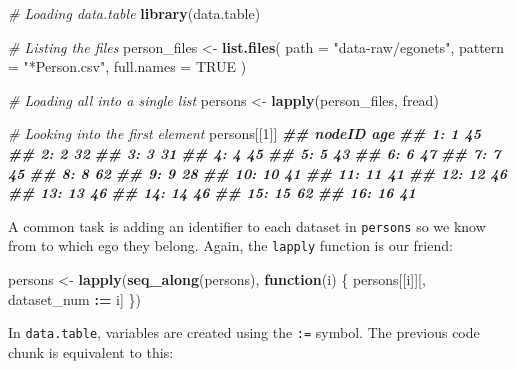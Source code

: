 \documentclass[
]{book}
\newenvironment{Shaded}{\begin{snugshade}}{\end{snugshade}}
\newcommand{\AttributeTok}[1]{\textcolor[rgb]{0.13,0.29,0.53}{#1}}
\newcommand{\CommentTok}[1]{\textcolor[rgb]{0.56,0.35,0.01}{\textit{#1}}}
\newcommand{\ConstantTok}[1]{\textcolor[rgb]{0.56,0.35,0.01}{#1}}
\newcommand{\ControlFlowTok}[1]{\textcolor[rgb]{0.13,0.29,0.53}{\textbf{#1}}}
\newcommand{\DecValTok}[1]{\textcolor[rgb]{0.00,0.00,0.81}{#1}}
\newcommand{\DocumentationTok}[1]{\textcolor[rgb]{0.56,0.35,0.01}{\textbf{\textit{#1}}}}
\newcommand{\FunctionTok}[1]{\textcolor[rgb]{0.13,0.29,0.53}{\textbf{#1}}}
\newcommand{\NormalTok}[1]{#1}
\newcommand{\OtherTok}[1]{\textcolor[rgb]{0.56,0.35,0.01}{#1}}
\newcommand{\SpecialCharTok}[1]{\textcolor[rgb]{0.81,0.36,0.00}{\textbf{#1}}}
\newcommand{\StringTok}[1]{\textcolor[rgb]{0.31,0.60,0.02}{#1}}
\begin{document}
\begin{Shaded}
\begin{Highlighting}[]
\CommentTok{\# Loading data.table}
\FunctionTok{library}\NormalTok{(data.table)}

\CommentTok{\# Listing the files}
\NormalTok{person\_files }\OtherTok{\textless{}{-}} \FunctionTok{list.files}\NormalTok{(}
  \AttributeTok{path       =} \StringTok{"data{-}raw/egonets"}\NormalTok{,}
  \AttributeTok{pattern    =} \StringTok{"*Person.csv"}\NormalTok{,}
  \AttributeTok{full.names =} \ConstantTok{TRUE}
\NormalTok{  )}

\CommentTok{\# Loading all into a single list}
\NormalTok{persons }\OtherTok{\textless{}{-}} \FunctionTok{lapply}\NormalTok{(person\_files, fread)}

\CommentTok{\# Looking into the first element}
\NormalTok{persons[[}\DecValTok{1}\NormalTok{]]}
\DocumentationTok{\#\#     nodeID age}
\DocumentationTok{\#\#  1:      1  45}
\DocumentationTok{\#\#  2:      2  32}
\DocumentationTok{\#\#  3:      3  31}
\DocumentationTok{\#\#  4:      4  45}
\DocumentationTok{\#\#  5:      5  43}
\DocumentationTok{\#\#  6:      6  47}
\DocumentationTok{\#\#  7:      7  45}
\DocumentationTok{\#\#  8:      8  62}
\DocumentationTok{\#\#  9:      9  28}
\DocumentationTok{\#\# 10:     10  41}
\DocumentationTok{\#\# 11:     11  41}
\DocumentationTok{\#\# 12:     12  46}
\DocumentationTok{\#\# 13:     13  46}
\DocumentationTok{\#\# 14:     14  46}
\DocumentationTok{\#\# 15:     15  62}
\DocumentationTok{\#\# 16:     16  41}
\end{Highlighting}
\end{Shaded}

A common task is adding an identifier to each dataset in \texttt{persons} so we know from to which ego they belong. Again, the \texttt{lapply} function is our friend:

\begin{Shaded}
\begin{Highlighting}[]
\NormalTok{persons }\OtherTok{\textless{}{-}} \FunctionTok{lapply}\NormalTok{(}\FunctionTok{seq\_along}\NormalTok{(persons), }\ControlFlowTok{function}\NormalTok{(i) \{}
\NormalTok{  persons[[i]][, dataset\_num }\SpecialCharTok{:=}\NormalTok{ i]}
\NormalTok{\})}
\end{Highlighting}
\end{Shaded}

In \texttt{data.table}, variables are created using the \texttt{:=} symbol. The previous code chunk is equivalent to this:
\end{document}
